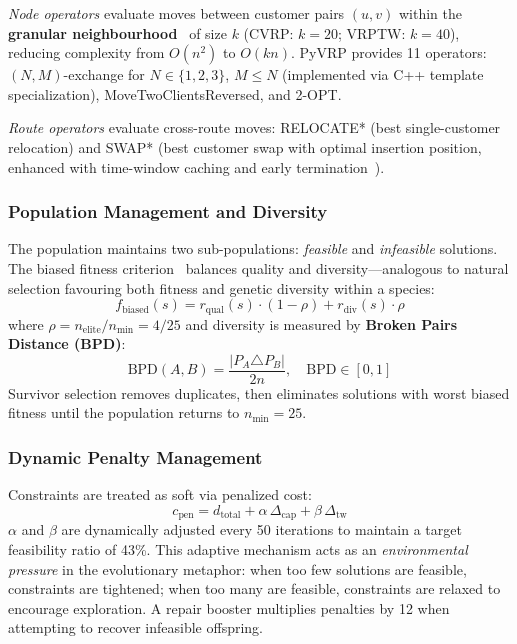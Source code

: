 \documentclass[conference]{IEEEtran}
\begin{document}
\textit{Node operators} evaluate moves between customer pairs $(u,v)$ within
the \textbf{granular neighbourhood}~\cite{toth2003granular} of size $k$
(CVRP: $k=20$; VRPTW: $k=40$), reducing complexity from $O(n^2)$ to
$O(kn)$. PyVRP provides 11 operators: $(N,M)$-exchange for
$N\in\{1,2,3\}$, $M\leq N$ (implemented via C++ template specialization),
MoveTwoClientsReversed, and 2-OPT.

\textit{Route operators} evaluate cross-route moves: RELOCATE* (best
single-customer relocation) and SWAP* (best customer swap with optimal
insertion position, enhanced with time-window caching and early
termination~\cite{wouda2024pyvrp}).

\subsubsection{Population Management and Diversity}
The population maintains two sub-populations: \textit{feasible} and
\textit{infeasible} solutions. The biased fitness
criterion~\cite{vidal2022hybrid} balances quality and diversity---analogous
to natural selection favouring both fitness and genetic diversity within a
species:
\begin{equation}
  f_{\text{biased}}(s)=r_{\text{qual}}(s)\cdot(1-\rho)+r_{\text{div}}(s)\cdot\rho
\end{equation}
where $\rho = n_{\text{elite}}/n_{\min} = 4/25$ and diversity is measured
by \textbf{Broken Pairs Distance (BPD)}:
\begin{equation}
  \text{BPD}(A,B)=\frac{|P_A \triangle P_B|}{2n},\quad \text{BPD}\in[0,1]
\end{equation}
Survivor selection removes duplicates, then eliminates solutions with worst
biased fitness until the population returns to $n_{\min}=25$.

\subsubsection{Dynamic Penalty Management}
Constraints are treated as soft via penalized cost:
\begin{equation}
  c_{\text{pen}} = d_{\text{total}} + \alpha\,\Delta_{\text{cap}} + \beta\,\Delta_{\text{tw}}
\end{equation}
$\alpha$ and $\beta$ are dynamically adjusted every 50 iterations to
maintain a target feasibility ratio of 43\%. This adaptive mechanism acts
as an \textit{environmental pressure} in the evolutionary metaphor: when
too few solutions are feasible, constraints are tightened; when too many
are feasible, constraints are relaxed to encourage exploration. A repair
booster multiplies penalties by 12 when attempting to recover infeasible
offspring.
\end{document}
